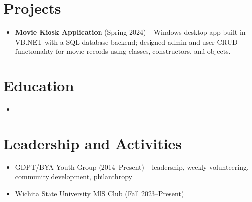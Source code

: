 \documentclass[11pt,a4paper,sans]{moderncv}
\begin{document}

\section{Projects}
\vspace{1pt}
\begin{itemize}
\item{\textbf{Movie Kiosk Application} (Spring 2024) -- Windows desktop app built in VB.NET with a SQL database backend; designed admin and user CRUD functionality for movie records using classes, constructors, and objects.}
\end{itemize}


\section{Education}
\vspace{1pt}
\begin{itemize}

\item{}

\end{itemize}


\section{Leadership and Activities}
\vspace{1pt}
\begin{itemize}
\item{GDPT/BYA Youth Group (2014--Present) -- leadership, weekly volunteering, community development, philanthropy}
\item{Wichita State University MIS Club (Fall 2023--Present)}
\end{itemize}
\end{document}
